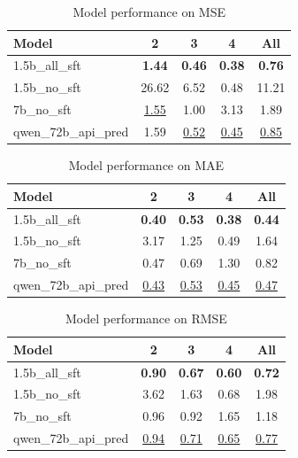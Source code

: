 \begin{table}[ht]
\centering
\begin{tabular}{lcccc}
\toprule
Model & 2 & 3 & 4 & All \\
\midrule
1.5b\_all\_sft & \textbf{1.44} & \textbf{0.46} & \textbf{0.38} & \textbf{0.76} \\
1.5b\_no\_sft & 26.62 & 6.52 & 0.48 & 11.21 \\
7b\_no\_sft & \underline{1.55} & 1.00 & 3.13 & 1.89 \\
qwen\_72b\_api\_pred & 1.59 & \underline{0.52} & \underline{0.45} & \underline{0.85} \\
\bottomrule
\end{tabular}
\caption{Model performance on MSE}
\label{tab:mse}
\end{table}

\begin{table}[ht]
\centering
\begin{tabular}{lcccc}
\toprule
Model & 2 & 3 & 4 & All \\
\midrule
1.5b\_all\_sft & \textbf{0.40} & \textbf{0.53} & \textbf{0.38} & \textbf{0.44} \\
1.5b\_no\_sft & 3.17 & 1.25 & 0.49 & 1.64 \\
7b\_no\_sft & 0.47 & 0.69 & 1.30 & 0.82 \\
qwen\_72b\_api\_pred & \underline{0.43} & \underline{0.53} & \underline{0.45} & \underline{0.47} \\
\bottomrule
\end{tabular}
\caption{Model performance on MAE}
\label{tab:mae}
\end{table}

\begin{table}[ht]
\centering
\begin{tabular}{lcccc}
\toprule
Model & 2 & 3 & 4 & All \\
\midrule
1.5b\_all\_sft & \textbf{0.90} & \textbf{0.67} & \textbf{0.60} & \textbf{0.72} \\
1.5b\_no\_sft & 3.62 & 1.63 & 0.68 & 1.98 \\
7b\_no\_sft & 0.96 & 0.92 & 1.65 & 1.18 \\
qwen\_72b\_api\_pred & \underline{0.94} & \underline{0.71} & \underline{0.65} & \underline{0.77} \\
\bottomrule
\end{tabular}
\caption{Model performance on RMSE}
\label{tab:rmse}
\end{table}

